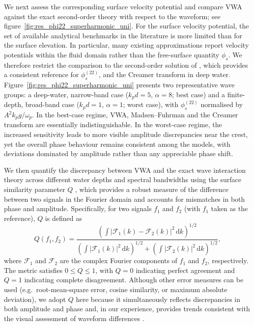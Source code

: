 \documentclass[lineno]{JFM-FLM_Au}
\begin{document}
We next assess the corresponding surface velocity potential and compare VWA against the exact second-order theory with respect to the waveform; see figure~\ref{fig:res_phi22_superharmonic_uni}. For the surface velocity potential, the set of available analytical benchmarks in the literature is more limited than for the surface elevation. In particular, many existing approximations report velocity potentials within the fluid domain rather than the free-surface quantity $\phi_s$. We therefore restrict the comparison to the second-order solution of \citet{madsen2012third}, which provides a consistent reference for $\phi_s^{(22)}$, and the Creamer transform in deep water. Figure~\ref{fig:res_phi22_superharmonic_uni} presents two representative wave groups: a deep-water, narrow-band case ($k_pd=5$, $\alpha=8$; best case) and a finite-depth, broad-band case ($k_pd=1$, $\alpha=1$; worst case), with $\phi_s^{(22)}$ normalised by $A^2 k_p g/\omega_p$. In the best-case regime, VWA, Madsen--Fuhrman and the Creamer transform are essentially indistinguishable. In the worst-case regime, the increased sensitivity leads to more visible amplitude discrepancies near the crest, yet the overall phase behaviour remains consistent among the models, with deviations dominated by amplitude rather than any appreciable phase shift.

We then quantify the discrepancy between VWA and the exact wave interaction theory across different water depths and spectral bandwidths using the surface similarity parameter $Q$ \citep{perlin_robust_2016}, which provides a robust measure of the difference between two signals in the Fourier domain and accounts for mismatches in both phase and amplitude. Specifically, for two signals $f_1$ and $f_2$ (with $f_1$ taken as the reference), $Q$ is defined as
\begin{equation}
\label{eq:Q_def}
Q\left(f_1,f_2\right)=\frac{\left(\displaystyle\int\left|\mathcal{F}_1(k)-\mathcal{F}_2(k)\right|^2\,\mathrm{d}k\right)^{1/2}}{\left(\displaystyle\int\left|\mathcal{F}_1(k)\right|^2\,\mathrm{d}k\right)^{1/2}+\left(\displaystyle\int\left|\mathcal{F}_2(k)\right|^2\,\mathrm{d}k\right)^{1/2}},
\end{equation}
where $\mathcal{F}_1$ and $\mathcal{F}_2$ are the complex Fourier components of $f_1$ and $f_2$, respectively. The metric satisfies $0\le Q\le1$, with $Q=0$ indicating perfect agreement and $Q=1$ indicating complete disagreement. Although other error measures can be used (e.g.\ root-mean-square error, cosine similarity, or maximum absolute deviation), we adopt $Q$ here because it simultaneously reflects discrepancies in both amplitude and phase and, in our experience, provides trends consistent with the visual assessment of waveform differences \citep{liu_phase_2025}.
\end{document}
